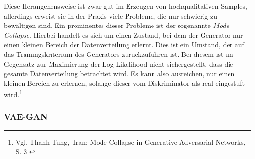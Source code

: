 Diese Herangehensweise ist zwar gut im Erzeugen von hochqualitativen Samples, allerdings erweist sie in der Praxis viele Probleme, die nur schwierig zu bewältigen sind. Ein prominentes dieser Probleme ist der sogenannte \textit{Mode Collapse}. Hierbei handelt es sich um einen Zustand, bei dem der Generator nur einen kleinen Bereich der Datenverteilung erlernt. Dies ist ein Umstand, der auf das Trainingskriterium des Generators zurückzuführen ist. Bei diesem ist im Gegensatz zur Maximierung der Log-Likelihood nicht sichergestellt, dass die gesamte Datenverteilung betrachtet wird. Es kann also ausreichen, nur einen kleinen Bereich zu erlernen, solange dieser vom Diskriminator als real eingestuft wird.\footnote{
    Vgl. Thanh-Tung, Tran: Mode Collapse in Generative Adversarial Networks, S. 3
    \cite{thanhtung2020catastrophicforgettingmodecollapse}
}

\subsubsection{VAE-GAN}

